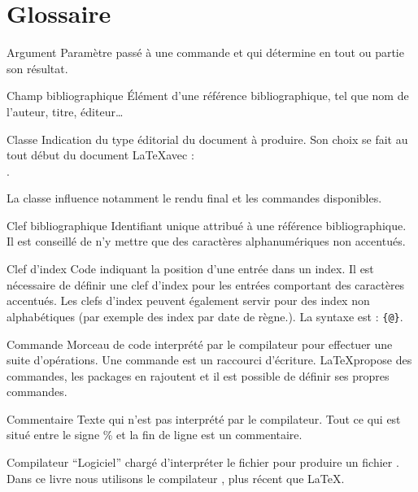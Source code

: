 \chapter{Glossaire}


\begin{glossaire}
\item[Argument] Paramètre passé à une commande et qui détermine en tout ou partie son résultat.


\item[Champ bibliographique] Élément d'une référence bibliographique, tel que nom de l'auteur, titre, éditeur…


\item[Classe] Indication du type éditorial du document à produire. Son choix se fait au tout début du document \LaTeX avec :\\ . 

La classe influence notamment le rendu final et les commandes disponibles.

\item[Clef bibliographique] Identifiant unique attribué à une référence bibliographique. Il est conseillé de n'y mettre que des caractères alphanumériques non accentués.

\item[Clef d'index] Code indiquant la position d'une entrée dans un index. Il est nécessaire de définir une clef d'index pour les entrées comportant des caractères accentués. Les clefs d'index peuvent également servir pour des index non alphabétiques (par exemple des index par date de règne.). La syntaxe est : \verb|{|\verb|@|\verb|}|.

\item[Commande] Morceau de code  interprété par le compilateur pour effectuer une suite d'opérations. Une commande est un raccourci d'écriture. \LaTeX propose des commandes, les packages en rajoutent et il est possible de définir ses propres commandes.

\item[Commentaire] Texte qui n'est pas interprété par le compilateur. Tout ce qui est situé entre le signe \% et la fin de ligne est un commentaire.

\item[Compilateur] \enquote{Logiciel} chargé d'interpréter le fichier  pour produire un fichier . Dans ce livre nous utilisons le compilateur \XeLaTeX, plus récent que \LaTeX.


\end{glossaire}
